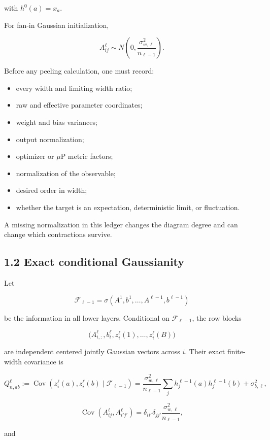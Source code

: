 with \(h^0(a)=x_a\).

For fan-in Gaussian initialization,

\[
A^\ell_{ij}
\sim
N\left(0,\frac{\sigma_{w,\ell}^2}{n_{\ell-1}}\right).
\]


Before any peeling calculation, one must record:

\begin{itemize}
\item every width and limiting width ratio;
\item raw and effective parameter coordinates;
\item weight and bias variances;
\item output normalization;
\item optimizer or \(\mu\)P metric factors;
\item normalization of the observable;
\item desired order in width;
\item whether the target is an expectation, deterministic limit, or fluctuation.
\end{itemize}


A missing normalization in this ledger changes the diagram degree and can
change which contractions survive.

\subsection*{1.2 Exact conditional Gaussianity}


Let

\[
\mathcal F_{\ell-1}
=
\sigma(A^1,b^1,\ldots,A^{\ell-1},b^{\ell-1})
\]


be the information in all lower layers. Conditional on
\(\mathcal F_{\ell-1}\), the row blocks

\[
\bigl(A^\ell_{i,:},b_i^\ell,
      z_i^\ell(1),\ldots,z_i^\ell(B)\bigr)
\]


are independent centered jointly Gaussian vectors across \(i\). Their exact
finite-width covariance is

\[
Q^\ell_{n,ab}
:=
\operatorname{Cov}
\left(z_i^\ell(a),z_i^\ell(b)\mid\mathcal F_{\ell-1}\right)
=
\frac{\sigma_{w,\ell}^2}{n_{\ell-1}}
\sum_jh_j^{\ell-1}(a)h_j^{\ell-1}(b)
+\sigma_{b,\ell}^2,
\]


\[
\operatorname{Cov}(A^\ell_{ij},A^\ell_{i'j'})
=
\delta_{ii'}\delta_{jj'}
\frac{\sigma_{w,\ell}^2}{n_{\ell-1}},
\]


and

